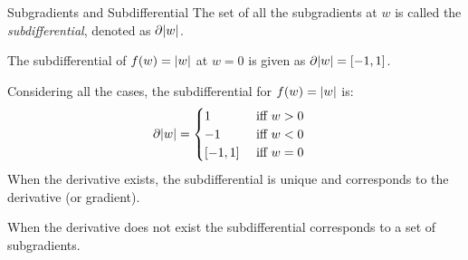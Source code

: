 \begin{frame}{Subgradients and Subdifferential}
The set of all the
subgradients at $w$ is called the {\em subdifferential}, denoted
as $\partial\lvert w\rvert$. 

\medskip

The subdifferential of $f(w) = \lvert w\rvert$ at $w=0$ is given as $\partial\lvert w\rvert = [-1,1]$.

	\medskip

    Considering all the cases, 
    the subdifferential for $f(w) = \lvert w\rvert$ is:
    \begin{align*}
        \partial\lvert w\rvert & = 
        \begin{cases}
            1 & \text{ iff } w > 0\\
            -1 & \text{ iff } w < 0\\
            [-1,1] & \text{ iff } w = 0\\
        \end{cases}
    \end{align*}
    When the derivative exists, the subdifferential is
    unique and corresponds to the derivative (or gradient).

    \medskip

When the derivative does not exist the subdifferential corresponds to a set of
subgradients. 
\end{frame}
%
%
